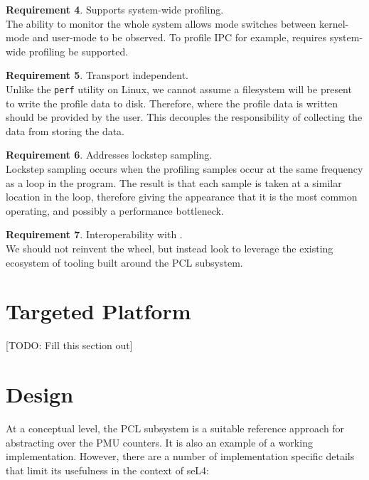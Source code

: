 \textbf{Requirement 4}. Supports system-wide profiling.\\
The ability to monitor the whole system allows mode switches between kernel-mode and user-mode to be observed. To profile IPC for example, requires system-wide profiling be supported. 

\textbf{Requirement 5}. Transport independent.\\
Unlike the \texttt{perf} utility on Linux, we cannot assume a filesystem will be present to write the profile data to disk. Therefore, where the profile data is written should be provided by the user. This decouples the responsibility of collecting the data from storing the data.

\textbf{Requirement 6}. Addresses lockstep sampling.\\
Lockstep sampling occurs when the profiling samples occur at the same frequency as a loop in the program. The result is that each sample is taken at a similar location in the loop, therefore giving the appearance that it is the most common operating, and possibly a performance bottleneck.

\textbf{Requirement 7}. Interoperability with .\\
We should not reinvent the wheel, but instead look to leverage the existing ecosystem of tooling built around the PCL subsystem. 

\section{Targeted Platform}

[TODO: Fill this section out]

\section{Design}

At a conceptual level, the PCL subsystem is a suitable reference approach for abstracting over the PMU counters. It is also an example of a working implementation. However, there are a number of implementation specific details that limit its usefulness in the context of seL4:

